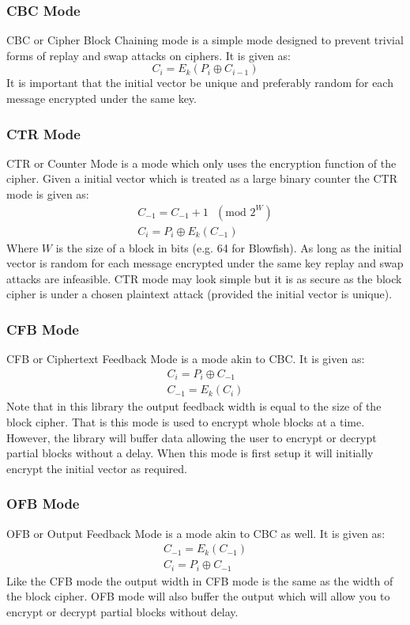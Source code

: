 \documentclass[synpaper]{book}
\begin{document}
\subsubsection{CBC Mode}
CBC or Cipher Block Chaining mode is a simple mode designed to prevent trivial forms of replay and swap attacks on ciphers.
It is given as:
\begin{equation}
C_i = E_k(P_i \oplus C_{i - 1})
\end{equation}
It is important that the initial vector be unique and preferably random for each message encrypted under the same key.

\subsubsection{CTR Mode}
CTR or Counter Mode is a mode which only uses the encryption function of the cipher.  Given a initial vector which is
treated as a large binary counter the CTR mode is given as:
\begin{eqnarray}
C_{-1} = C_{-1} + 1\mbox{ }(\mbox{mod }2^W) \nonumber \\
C_i = P_i \oplus E_k(C_{-1})
\end{eqnarray}
Where $W$ is the size of a block in bits (e.g. 64 for Blowfish).  As long as the initial vector is random for each message
encrypted under the same key replay and swap attacks are infeasible.  CTR mode may look simple but it is as secure
as the block cipher is under a chosen plaintext attack (provided the initial vector is unique).

\subsubsection{CFB Mode}
CFB or Ciphertext Feedback Mode is a mode akin to CBC.  It is given as:
\begin{eqnarray}
C_i = P_i \oplus C_{-1} \nonumber \\
C_{-1} = E_k(C_i)
\end{eqnarray}
Note that in this library the output feedback width is equal to the size of the block cipher.  That is this mode is used
to encrypt whole blocks at a time.  However, the library will buffer data allowing the user to encrypt or decrypt partial
blocks without a delay.  When this mode is first setup it will initially encrypt the initial vector as required.

\subsubsection{OFB Mode}
OFB or Output Feedback Mode is a mode akin to CBC as well.  It is given as:
\begin{eqnarray}
C_{-1} = E_k(C_{-1}) \nonumber \\
C_i = P_i \oplus C_{-1}
\end{eqnarray}
Like the CFB mode the output width in CFB mode is the same as the width of the block cipher.  OFB mode will also
buffer the output which will allow you to encrypt or decrypt partial blocks without delay.
\end{document}
